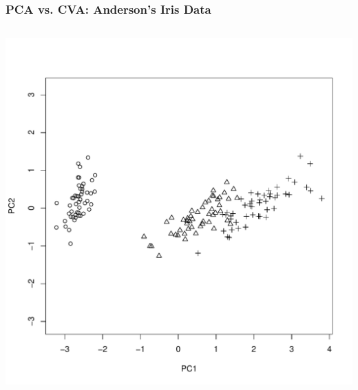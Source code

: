 \documentclass{beamer}
\begin{document}
% 
% 


\begin{frame}
  \frametitle{PCA vs. CVA: Anderson's Iris Data}

\begin{columns}

\begin{column}{0.5\textwidth}
\begin{center}
\includegraphics[width=\textwidth]{iris-PCA}
\end{center}
\end{column}


\end{columns}
\end{frame}
\end{document}
